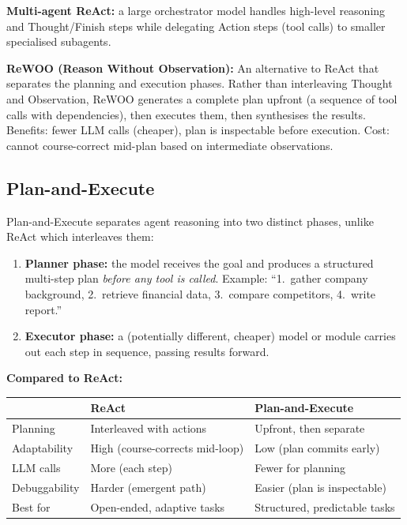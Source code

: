 \textbf{Multi-agent ReAct:} a large orchestrator model handles high-level reasoning
and Thought/Finish steps while delegating Action steps (tool calls) to smaller
specialised subagents.

\textbf{ReWOO (Reason Without Observation):}
An alternative to ReAct that separates the planning and execution phases. Rather than
interleaving Thought and Observation, ReWOO generates a complete plan upfront (a
sequence of tool calls with dependencies), then executes them, then synthesises the
results. Benefits: fewer LLM calls (cheaper), plan is inspectable before execution.
Cost: cannot course-correct mid-plan based on intermediate observations.

\subsection{Plan-and-Execute}

Plan-and-Execute separates agent reasoning into two distinct phases, unlike ReAct
which interleaves them:

\begin{enumerate}
  \item \textbf{Planner phase:} the model receives the goal and produces a structured
    multi-step plan \emph{before any tool is called}. Example: ``1.~gather company
    background, 2.~retrieve financial data, 3.~compare competitors, 4.~write report.''
  \item \textbf{Executor phase:} a (potentially different, cheaper) model or module
    carries out each step in sequence, passing results forward.
\end{enumerate}

\textbf{Compared to ReAct:}

\begin{center}
\begin{tabular}{lll}
\toprule
 & \textbf{ReAct} & \textbf{Plan-and-Execute} \\
\midrule
Planning & Interleaved with actions & Upfront, then separate \\
Adaptability & High (course-corrects mid-loop) & Low (plan commits early) \\
LLM calls & More (each step) & Fewer for planning \\
Debuggability & Harder (emergent path) & Easier (plan is inspectable) \\
Best for & Open-ended, adaptive tasks & Structured, predictable tasks \\
\bottomrule
\end{tabular}
\end{center}

